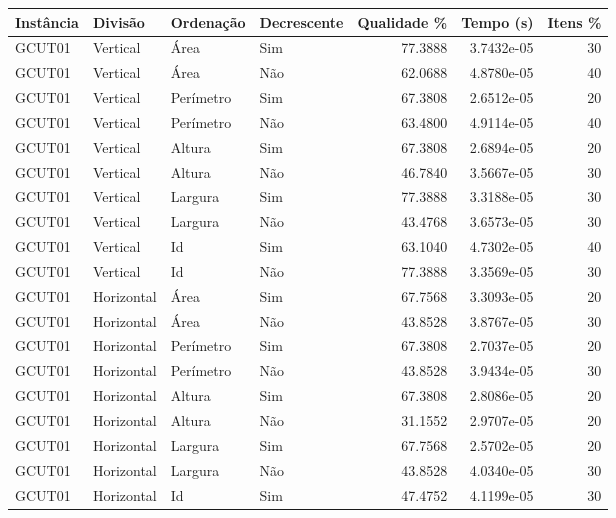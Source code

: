\begin{tabular}{llllrrr}
\hline
Instância & Divisão     & Ordenação & Decrescente & Qualidade \% & Tempo (s)  & Itens \% \\
\hline
GCUT01    & Vertical    & Área      & Sim         & 77.3888      & 3.7432e-05 & 30       \\
GCUT01    & Vertical    & Área      & Não         & 62.0688      & 4.8780e-05 & 40       \\
GCUT01    & Vertical    & Perímetro & Sim         & 67.3808      & 2.6512e-05 & 20       \\
GCUT01    & Vertical    & Perímetro & Não         & 63.4800      & 4.9114e-05 & 40       \\
GCUT01    & Vertical    & Altura    & Sim         & 67.3808      & 2.6894e-05 & 20       \\
GCUT01    & Vertical    & Altura    & Não         & 46.7840      & 3.5667e-05 & 30       \\
GCUT01    & Vertical    & Largura   & Sim         & 77.3888      & 3.3188e-05 & 30       \\
GCUT01    & Vertical    & Largura   & Não         & 43.4768      & 3.6573e-05 & 30       \\
GCUT01    & Vertical    & Id        & Sim         & 63.1040      & 4.7302e-05 & 40       \\
GCUT01    & Vertical    & Id        & Não         & 77.3888      & 3.3569e-05 & 30       \\
GCUT01    & Horizontal  & Área      & Sim         & 67.7568      & 3.3093e-05 & 20       \\
GCUT01    & Horizontal  & Área      & Não         & 43.8528      & 3.8767e-05 & 30       \\
GCUT01    & Horizontal  & Perímetro & Sim         & 67.3808      & 2.7037e-05 & 20       \\
GCUT01    & Horizontal  & Perímetro & Não         & 43.8528      & 3.9434e-05 & 30       \\
GCUT01    & Horizontal  & Altura    & Sim         & 67.3808      & 2.8086e-05 & 20       \\
GCUT01    & Horizontal  & Altura    & Não         & 31.1552      & 2.9707e-05 & 20       \\
GCUT01    & Horizontal  & Largura   & Sim         & 67.7568      & 2.5702e-05 & 20       \\
GCUT01    & Horizontal  & Largura   & Não         & 43.8528      & 4.0340e-05 & 30       \\
GCUT01    & Horizontal  & Id        & Sim         & 47.4752      & 4.1199e-05 & 30       \\

\end{tabular}
